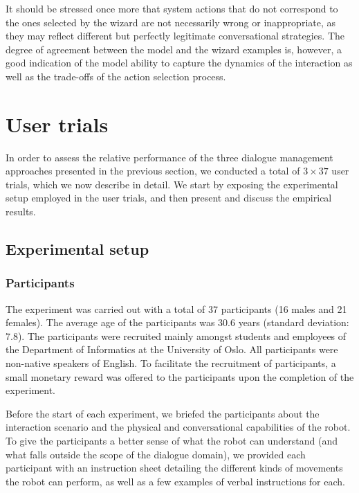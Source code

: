 It should be stressed once more that system actions that do not correspond to the ones selected by the wizard are not necessarily wrong or inappropriate, as they may reflect different but perfectly legitimate conversational strategies. The degree of agreement between the model and the wizard examples is, however, a good indication of the model ability to capture the dynamics of the interaction as well as the trade-offs of the action selection process. 

\section{User trials}

In order to assess the relative performance of the three dialogue management approaches presented in the previous section, we conducted a total of $3 \times 37$ user trials, which we now describe in detail. We start by exposing the experimental setup employed in the user trials, and then present and discuss the empirical results. 

\subsection{Experimental setup}

\subsubsection*{Participants}

The experiment was carried out with a total of 37 participants (16 males and 21 females).  The average age of the participants was 30.6 years (standard deviation: 7.8). The participants were recruited mainly amongst students and employees of the Department of Informatics at the University of Oslo. All participants were non-native speakers of English. To facilitate the recruitment of participants, a small monetary reward was offered to the participants upon the completion of the experiment. 

Before the start of each experiment, we briefed the participants about the interaction scenario and the physical and conversational capabilities of the robot. To give the participants a better sense of what the robot can understand (and what falls outside the scope of the dialogue domain), we provided each participant with an instruction sheet detailing the different kinds of movements the robot can perform, as well as a few examples of verbal instructions for each.

